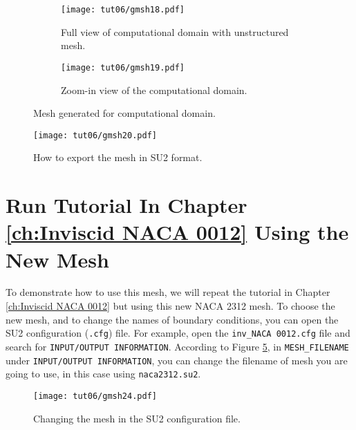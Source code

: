 \begin{figure}[ht]
    \centering
     \begin{subfigure}[b]{.5\textwidth}
         \centering
         \texttt{[image: tut06/gmsh18.pdf]}
         \caption{Full view of computational domain with unstructured mesh.}
         \label{fig6:gmsh18 a}
     \end{subfigure}
     \hfill
     \begin{subfigure}[b]{.5\textwidth}
         \centering
         \texttt{[image: tut06/gmsh19.pdf]}
         \caption{Zoom-in view of the computational domain.}
         \label{fig6:gmsh18 b}
     \end{subfigure}  
    \caption{Mesh generated for computational domain.}
    \label{fig6:gmsh18}
\end{figure}
\begin{figure}[H]
    \centering
    \texttt{[image: tut06/gmsh20.pdf]}
    \caption{How to export the mesh in SU2 format.}
    \label{fig6:gmsh20}
\end{figure}
\section*{Run Tutorial In Chapter \ref{ch:Inviscid NACA 0012} Using the New Mesh}
To demonstrate how to use this mesh, we will repeat the tutorial in Chapter \ref{ch:Inviscid NACA 0012} but using this new NACA 2312 mesh. To choose the new mesh, and to change the names of boundary conditions, you can open the SU2 configuration (\texttt{.cfg}) file. For example, open the \texttt{inv\_NACA 0012.cfg} file and search for \texttt{INPUT/OUTPUT INFORMATION}. According to Figure \ref{fig6:gmsh24}, in \texttt{MESH\_FILENAME} under \texttt{INPUT/OUTPUT INFORMATION}, you can change the filename of mesh you are going to use, in this case using \texttt{naca2312.su2}.
\begin{figure}[ht]
    \centering
    \texttt{[image: tut06/gmsh24.pdf]}
    \caption{Changing the mesh in the SU2 configuration file.}
    \label{fig6:gmsh24}
\end{figure}

